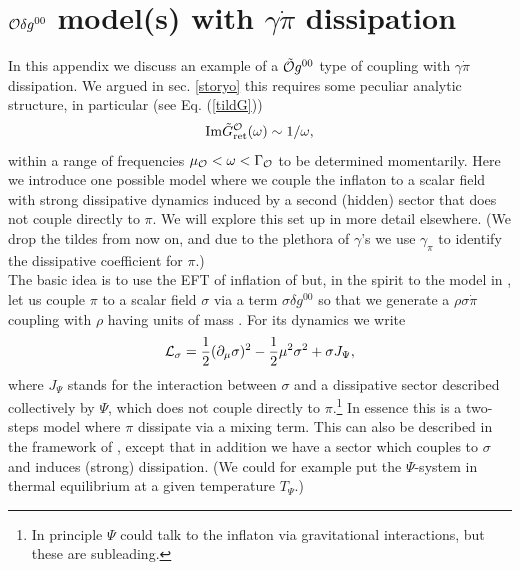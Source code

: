 \documentclass[11pt,amsmath,floats,floatfix,nofootinbib,secnumarabic, superscriptaddress, tightenlines]{revtex4}
\newcommand{\beq}{\begin{equation}}
\newcommand{\eeq}{\end{equation}}
\newcommand{\calo}{{\cal O}}
\newcommand{\calL}{{\cal L}}
\begin{document}
{%

\section{$\calo\delta g^{00}$ model(s) with $\gamma\dot\pi$ dissipation}\label{mag00}

In this appendix we discuss an example of a $\tilde\calo g^{00}$ type of coupling with $\gamma\dot\pi$ dissipation. We argued in sec. \ref{storyo} this requires some peculiar analytic structure, in particular (see Eq. (\ref{tildG}))
\beq
{\rm Im} \tilde G_{\rm ret}^\calo (\omega) \sim 1/\omega,
\eeq
within a range of frequencies $\mu_\calo < \omega < \Gamma_\calo$ to be determined momentarily. Here we introduce one possible model where we couple the inflaton to a scalar field with strong dissipative dynamics induced by a second (hidden) sector that does not couple directly to $\pi$. We will explore this set up in more detail elsewhere. (We drop the tildes from now on, and due to the plethora of $\gamma$'s we use $\gamma_\pi$ to identify the dissipative coefficient for $\pi$.)\\

The basic idea is to use the EFT of inflation of \cite{eft1} but, in the spirit to the model in \cite{dan2}, let us couple $\pi$ to a scalar field $\sigma$ via a term $\sigma \delta g^{00}$ so that we generate a $\rho \sigma\dot\pi$ coupling with $\rho$ having units of mass \cite{dan2}. For its dynamics we write
\beq
\calL_\sigma = \frac{1}{2}(\partial_\mu \sigma)^2 - \frac{1}{2} \mu^2 \sigma^2 + \sigma J_\Psi,
\eeq
where $J_\Psi$ stands for the interaction between $\sigma$ and a dissipative sector described collectively by $\Psi$, which does not
couple directly to $\pi$.\footnote{In principle $\Psi$ could talk to the inflaton via gravitational interactions, but these are subleading.}
In essence this is a two-steps model where $\pi$ dissipate via a mixing term. This can also be described in the framework of \cite{multieft}, except that in addition we have a sector which couples to $\sigma$ and induces (strong) dissipation. (We could for example put the $\Psi$-system in thermal equilibrium at a given temperature $T_\Psi$.)\\

}
\end{document}
